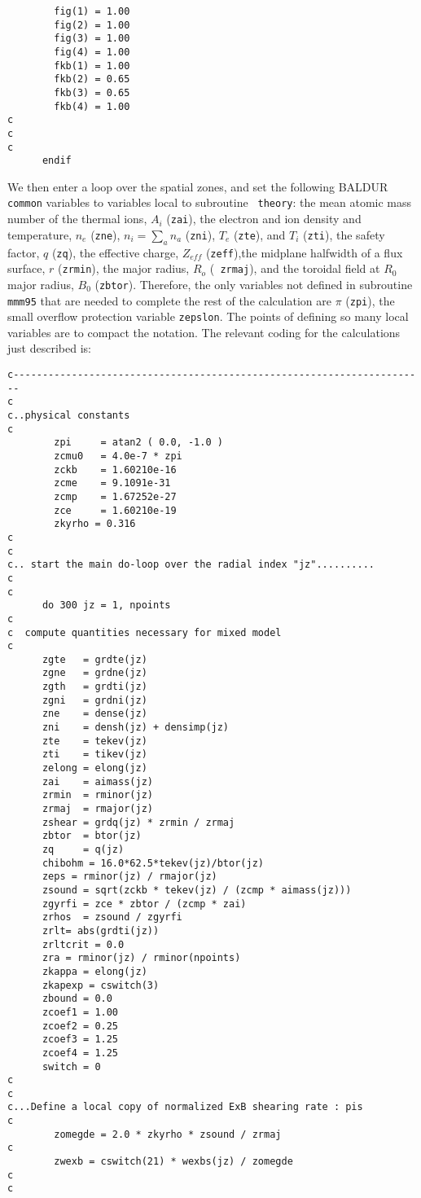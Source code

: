 \begin{verbatim}
        fig(1) = 1.00
        fig(2) = 1.00
        fig(3) = 1.00
        fig(4) = 1.00
        fkb(1) = 1.00
       	fkb(2) = 0.65
        fkb(3) = 0.65
        fkb(4) = 1.00
c
c
c
      endif

\end{verbatim}

We then enter a loop over the spatial zones, and set the following
BALDUR {\tt common} variables to variables local to subroutine {\tt
theory}: the mean atomic mass number of the thermal ions, $A_{i}$
({\tt zai}), the electron and ion density and temperature, $n_{e}$
({\tt zne}), $n_{i}=\sum_{a}n_{a}$ ({\tt zni}), $T_{e}$ ({\tt zte}),
and $T_{i}$ ({\tt zti}), the safety factor, $q$ ({\tt zq}), the
effective charge, $Z_{eff}$ ({\tt zeff}),the midplane halfwidth of a
flux surface, $r$ ({\tt zrmin}), the major radius, $R_{o}$ ({\tt
zrmaj}), and the toroidal field at $R_0$ major radius, $B_{0}$
({\tt zbtor}).  Therefore, the only variables not defined in
subroutine {\tt mmm95} that are needed to complete the rest of the
calculation are $\pi$ ({\tt zpi}), the small overflow protection
variable {\tt zepslon}.  The points of defining so many local
variables are to compact the notation.  The relevant coding for the
calculations just described is:

\begin{verbatim}
c-----------------------------------------------------------------------
c
c..physical constants
c
        zpi     = atan2 ( 0.0, -1.0 )
        zcmu0   = 4.0e-7 * zpi
        zckb    = 1.60210e-16
        zcme    = 9.1091e-31
        zcmp    = 1.67252e-27
        zce     = 1.60210e-19
        zkyrho = 0.316
c
c
c.. start the main do-loop over the radial index "jz"..........
c
c
      do 300 jz = 1, npoints
c
c  compute quantities necessary for mixed model
c
      zgte   = grdte(jz)
      zgne   = grdne(jz)
      zgth   = grdti(jz)
      zgni   = grdni(jz)
      zne    = dense(jz)
      zni    = densh(jz) + densimp(jz)
      zte    = tekev(jz)
      zti    = tikev(jz)
      zelong = elong(jz)
      zai    = aimass(jz)
      zrmin  = rminor(jz)
      zrmaj  = rmajor(jz)
      zshear = grdq(jz) * zrmin / zrmaj
      zbtor  = btor(jz)
      zq     = q(jz)
      chibohm = 16.0*62.5*tekev(jz)/btor(jz)
      zeps = rminor(jz) / rmajor(jz)
      zsound = sqrt(zckb * tekev(jz) / (zcmp * aimass(jz)))
      zgyrfi = zce * zbtor / (zcmp * zai)
      zrhos  = zsound / zgyrfi
      zrlt= abs(grdti(jz))
      zrltcrit = 0.0
      zra = rminor(jz) / rminor(npoints)
      zkappa = elong(jz)
      zkapexp = cswitch(3)
      zbound = 0.0
      zcoef1 = 1.00
      zcoef2 = 0.25
      zcoef3 = 1.25
      zcoef4 = 1.25  
      switch = 0   	
c
c
c...Define a local copy of normalized ExB shearing rate : pis
c
        zomegde = 2.0 * zkyrho * zsound / zrmaj 
c
        zwexb = cswitch(21) * wexbs(jz) / zomegde 
c
c
\end{verbatim}


